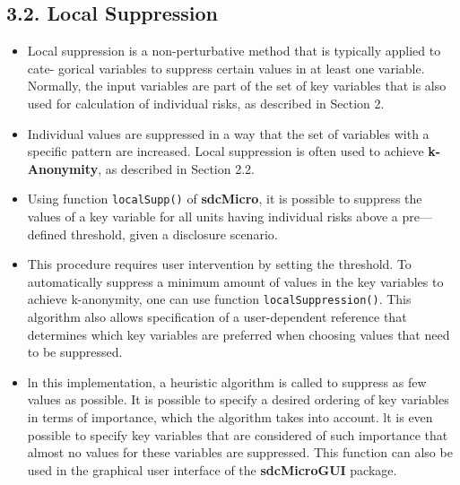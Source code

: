 \documentclass[]{article}
\begin{document}
\subsection*{3.2. Local Suppression}
\begin{itemize}
\item Local suppression is a non-perturbative method that is typically applied to cate-
gorical variables to suppress certain values in at least one variable. Normally, the
input variables are part of the set of key variables that is also used for calculation
of individual risks, as described in Section 2. 

\item Individual values are suppressed
in a way that the set of variables with a speciﬁc pattern are increased. Local
suppression is often used to achieve \textbf{k-Anonymity}, as described in Section 2.2.
\item Using function \texttt{localSupp()} of \textbf{sdcMicro}, it is possible to suppress the values of
a key variable for all units having individual risks above a pre—deﬁned threshold,
given a disclosure scenario. 


\item This procedure requires user intervention by setting
the threshold. To automatically suppress a minimum amount of values in the key
variables to achieve k-anonymity, one can use function \texttt{localSuppression()}. This
algorithm also allows specification of a user-dependent reference that determines
which key variables are preferred when choosing values that need to be suppressed.

\item ln this implementation, a heuristic algorithm is called to suppress as few values
as possible. It is possible to specify a desired ordering of key variables in terms of
importance, which the algorithm takes into account. lt is even possible to specify
key variables that are considered of such importance that almost no values for
these variables are suppressed. This function can also be used in the graphical
user interface of the \textbf{sdcMicroGUI} package.
\end{itemize}
\newpage
\end{document}
